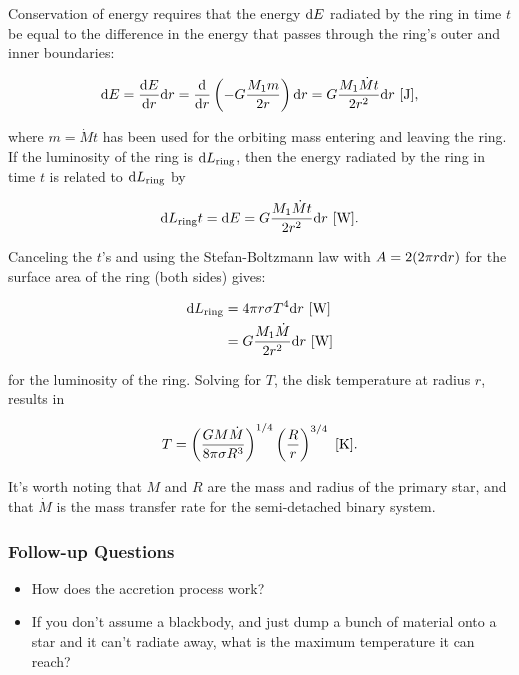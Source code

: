 \documentclass[a4paper,10pt]{article}
\begin{document}
{\noindent}Conservation of energy requires that the energy ${\rm d}E$ radiated by the ring in time $t$ be equal to the difference in the energy that passes through the ring's outer and inner boundaries:

\begin{align*}
{\rm d}E = \frac{{\rm d}E}{{\rm d}r} {\rm d}r = \frac{{\rm d}}{{\rm d}r} \left(-G \frac{M_1m}{2r}\right) {\rm d}r = G\frac{M_1\dot{M}t}{2r^2} {\rm d}r ~ [{\rm J}],
\end{align*}

{\noindent}where $m=\dot{M}t$ has been used for the orbiting mass entering and leaving the ring. If the luminosity of the ring is ${\rm d}L_{\rm ring}$, then the energy radiated by the ring in time $t$ is related to ${\rm d}L_{\rm ring}$ by

\begin{align*}
 {\rm d}L_{\rm ring}t = {\rm d}E = G\frac{M_1\dot{M}t}{2r^2} {\rm d}r ~ [{\rm W}].
\end{align*}

{\noindent}Canceling the $t$'s and using the Stefan-Boltzmann law with $A=2(2\pi r{\rm d}r)$ for the surface area of the ring (both sides) gives:

\begin{align*}
{\rm d}L_{\rm ring} &= 4\pi r\sigma T^4 {\rm d}r ~ [{\rm W}]\\
                              &= G\frac{M_1\dot{M}}{2r^2} {\rm d}r ~ [{\rm W}]
\end{align*}

{\noindent}for the luminosity of the ring. Solving for $T$, the disk temperature at radius $r$, results in

\begin{align*}
T = \left(\frac{GM\dot{M}}{8\pi\sigma R^3}\right)^{1/4} \left(\frac{R}{r}\right)^{3/4} ~ [{\rm K}].
\end{align*}

{\noindent}It's worth noting that $M$ and $R$ are the mass and radius of the primary star, and that $\dot{M}$ is the mass transfer rate for the semi-detached binary system.

\subsubsection{Follow-up Questions}

\begin{itemize}
    \item How does the accretion process work?
    \item If you don't assume a blackbody, and just dump a bunch of material onto a star and it can't radiate away, what is the maximum temperature it can reach?
\end{itemize}
\end{document}
